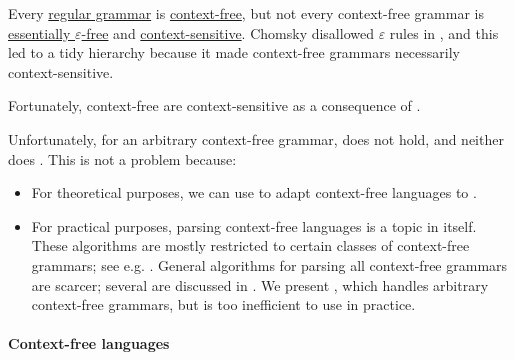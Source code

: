 \begin{remark}\label{rem:chomsky_hierarchy_failure}
  Every \hyperref[def:chomsky_hierarchy/regular]{regular grammar} is \hyperref[def:chomsky_hierarchy/context_free]{context-free}, but not every context-free grammar is \hyperref[def:epsilon_free_grammar]{essentially \( \varepsilon \)-free} and \hyperref[def:chomsky_hierarchy/context_sensitive]{context-sensitive}. Chomsky disallowed \( \varepsilon \) rules in \cite[def. 6]{Chomsky1959Grammars}, and this led to a tidy hierarchy because it made context-free grammars necessarily context-sensitive.

  Fortunately, context-free  are context-sensitive as a consequence of .

  Unfortunately, for an arbitrary context-free grammar,  does not hold, and neither does . This is not a problem because:
  \begin{itemize}
    \item For theoretical purposes, we can use  to adapt context-free languages to .

    \item For practical purposes, parsing context-free languages is a topic in itself. These algorithms are mostly restricted to certain classes of context-free grammars; see e.g. \cite[ch. 6]{Salomaa1973Languages}. General algorithms for parsing all context-free grammars are scarcer; several are discussed in \cite{Economopoulos2006Parsing}. We present , which handles arbitrary context-free grammars, but is too inefficient to use in practice.
  \end{itemize}
\end{remark}

\paragraph{Context-free languages}


